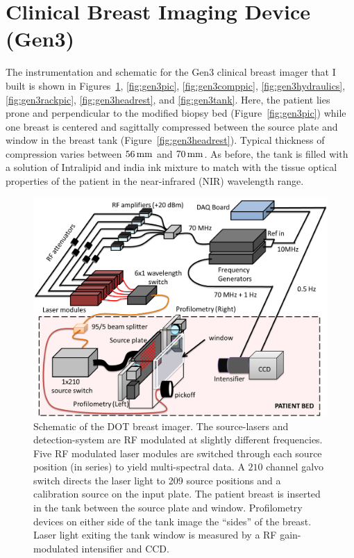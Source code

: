 \section{Clinical Breast Imaging Device (Gen3)}
\label{sec:Gen3}
The instrumentation and schematic for the Gen3 clinical breast imager that I built is shown in Figures~\ref{fig:gen3schem}, \ref{fig:gen3pic}, \ref{fig:gen3comppic}, \ref{fig:gen3hydraulics}, \ref{fig:gen3rackpic}, \ref{fig:gen3headrest}, and \ref{fig:gen3tank}. Here, the patient lies prone and perpendicular to the modified biopsy bed (Figure~\ref{fig:gen3pic}) while one breast is centered and sagittally compressed between the source plate and window in the breast tank (Figure~\ref{fig:gen3headrest}). Typical thickness of compression varies between $56\,{\rm mm}$ and $70\,{\rm mm}$. As before, the tank is filled with a solution of Intralipid and india ink mixture to match with the tissue optical properties of the patient in the near-infrared (NIR) wavelength range.
%
\begin{figure}[h]
\centering
\includegraphics[width=14cm]{./figures/4_Gen3/gen3schem.png}
\caption[Schematic of the Gen3 DOT breast imager]{Schematic of the DOT breast imager. The source-lasers and detection-system are RF modulated at slightly different frequencies. Five RF modulated laser modules are switched through each source position (in series) to yield multi-spectral data. A $210$ channel galvo switch directs the laser light to 209 source positions and a calibration source on the input plate. The patient breast is inserted in the tank between the source plate and window. Profilometry devices on either side of the tank image the “sides” of the breast. Laser light exiting the tank window is measured by a RF gain-modulated intensifier and CCD.}
\label{fig:gen3schem}
\end{figure}
